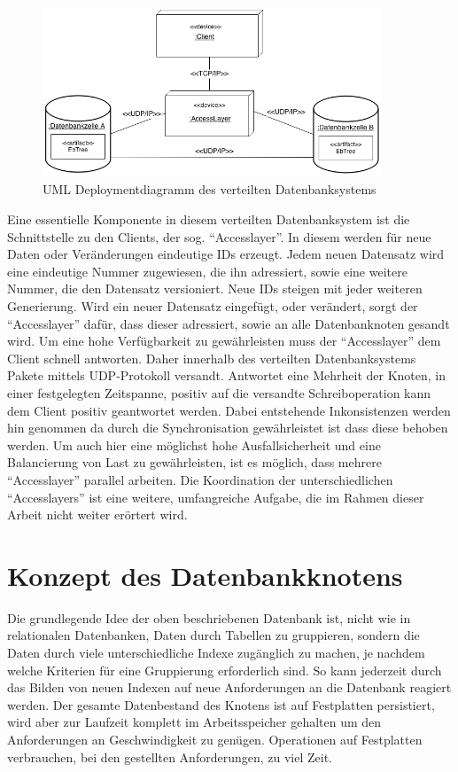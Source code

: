 \documentclass[a4paper,11pt,oneside,%
headsepline,												%
footsepline,												%
bibtotocnumbered									%
]{scrreprt}
\begin{document}
\begin{figure}[h!]
        \centering
    \includegraphics[width=0.9\textwidth]{bilder/uml_deployment_dia.png}
    \caption{UML Deploymentdiagramm des verteilten Datenbanksystems}
\end{figure}
Eine essentielle Komponente in diesem verteilten Datenbanksystem ist die Schnittstelle zu den Clients, der sog. \enquote{Accesslayer}. In diesem werden für neue Daten oder Veränderungen eindeutige IDs erzeugt. Jedem neuen Datensatz wird eine eindeutige Nummer zugewiesen, die ihn adressiert, sowie eine weitere Nummer, die den Datensatz versioniert. Neue IDs steigen mit jeder weiteren Generierung. Wird ein neuer Datensatz eingefügt, oder verändert, sorgt der \enquote{Accesslayer} dafür, dass dieser adressiert, sowie an alle Datenbanknoten gesandt wird. Um eine hohe Verfügbarkeit zu gewährleisten muss der \enquote{Accesslayer} dem Client schnell antworten. Daher innerhalb des verteilten Datenbanksystems Pakete mittels UDP-Protokoll versandt. Antwortet eine Mehrheit der Knoten, in einer festgelegten Zeitspanne, positiv auf die versandte Schreiboperation kann dem Client positiv geantwortet werden. Dabei entstehende Inkonsistenzen werden hin genommen da durch die Synchronisation gewährleistet ist dass diese behoben werden. Um auch hier eine möglichst hohe Ausfallsicherheit und eine Balancierung von Last zu gewährleisten, ist es möglich, dass mehrere \enquote{Accesslayer} parallel arbeiten. Die Koordination der unterschiedlichen \enquote{Accesslayers} ist eine weitere, umfangreiche Aufgabe, die im Rahmen dieser Arbeit nicht weiter erörtert wird.

\section{Konzept des Datenbankknotens}
\label{sec:DBConcept} 

Die grundlegende Idee der oben beschriebenen Datenbank ist, nicht wie in relationalen Datenbanken, Daten durch Tabellen zu gruppieren, sondern die Daten durch viele unterschiedliche Indexe zugänglich zu machen, je nachdem welche Kriterien für eine Gruppierung erforderlich sind. So kann jederzeit durch das Bilden von neuen Indexen auf neue Anforderungen an die Datenbank reagiert werden. Der gesamte Datenbestand des Knotens ist auf Festplatten persistiert, wird aber zur Laufzeit komplett im Arbeitsspeicher gehalten um den Anforderungen an Geschwindigkeit zu genügen. Operationen auf Festplatten verbrauchen, bei den gestellten Anforderungen, zu viel Zeit.\\
\end{document}
